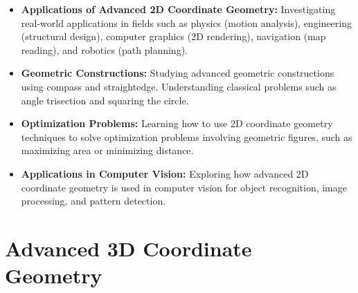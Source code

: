 \documentclass[openany]{book}
\begin{document}
\begin{itemize}
    \item \textbf{Applications of Advanced 2D Coordinate Geometry:} Investigating real-world applications in fields such as physics (motion analysis), engineering (structural design), computer graphics (2D rendering), navigation (map reading), and robotics (path planning).
    \item \textbf{Geometric Constructions:} Studying advanced geometric constructions using compass and straightedge. Understanding classical problems such as angle trisection and squaring the circle.
    \item \textbf{Optimization Problems:} Learning how to use 2D coordinate geometry techniques to solve optimization problems involving geometric figures, such as maximizing area or minimizing distance.
    \item \textbf{Applications in Computer Vision:} Exploring how advanced 2D coordinate geometry is used in computer vision for object recognition, image processing, and pattern detection.
\end{itemize}
\section{Advanced 3D Coordinate Geometry}
\end{document}

